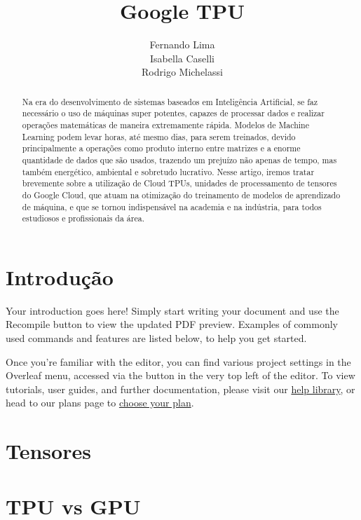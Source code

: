 \documentclass{article}
\title{Google TPU}
\author{Fernando Lima \\ Isabella Caselli \\ Rodrigo Michelassi}
\begin{document}
\maketitle

\begin{abstract}
Na era do desenvolvimento de sistemas baseados em Inteligência Artificial, se faz necessário o uso de máquinas super potentes, capazes de processar dados e realizar operações matemáticas de maneira extremamente rápida. Modelos de Machine Learning podem levar horas, até mesmo dias, para serem treinados, devido principalmente a operações como produto interno entre matrizes e a enorme quantidade de dados que são usados, trazendo um prejuízo não apenas de tempo, mas também energético, ambiental e sobretudo lucrativo. Nesse artigo, iremos tratar brevemente sobre a utilização de Cloud TPUs, unidades de processamento de tensores do Google Cloud, que atuam na otimização do treinamento de modelos de aprendizado de máquina, e que se tornou indispensável na academia e na indústria, para todos estudiosos e profissionais da área.
\end{abstract}

\section{Introdução}

Your introduction goes here! Simply start writing your document and use the Recompile button to view the updated PDF preview. Examples of commonly used commands and features are listed below, to help you get started.

Once you're familiar with the editor, you can find various project settings in the Overleaf menu, accessed via the button in the very top left of the editor. To view tutorials, user guides, and further documentation, please visit our \href{https://www.overleaf.com/learn}{help library}, or head to our plans page to \href{https://www.overleaf.com/user/subscription/plans}{choose your plan}.


\section{Tensores}

\section{TPU vs GPU}
\end{document}
